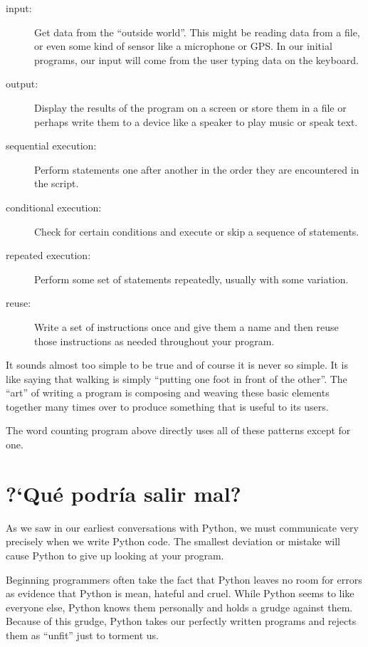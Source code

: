\begin{description}

\item[input:] Get data from the ``outside world''.  This might be 
reading data from a file, or even some kind of sensor like 
a microphone or GPS.  In our initial programs, our input will come from the user
typing data on the keyboard.

\item[output:] Display the results of the program on a screen
or store them in a file or perhaps write them to a device like a
speaker to play music or speak text.

\item[sequential execution:] Perform statements one after
another in the order they are encountered in the script.

\item[conditional execution:] Check for certain conditions and
execute or skip a sequence of statements.

\item[repeated execution:] Perform some set of statements 
repeatedly, usually with
some variation.

\item[reuse:] Write a set of instructions once and give them a name
and then reuse those instructions as needed throughout your program.

\end{description}

It sounds almost too simple to be true and of course it is never
so simple.  It is like saying that walking is simply
``putting one foot in front of the other''.  The ``art'' 
of writing a program is composing and weaving these
basic elements together many times over to produce something
that is useful to its users.

The word counting program above directly uses all of 
these patterns except for one.

\section{?`Qu\'e podr\'ia salir mal?}

As we saw in our earliest conversations with Python, we must
communicate very precisely when we write Python code.  The smallest
deviation or mistake will cause Python to give up looking at your
program.

Beginning programmers often take the fact that Python leaves no
room for errors as evidence that Python is mean, hateful and cruel.
While Python seems to like everyone else, Python knows them 
personally and holds a grudge against them.  Because of this grudge,
Python takes our perfectly written programs and rejects them as 
``unfit'' just to torment us.

